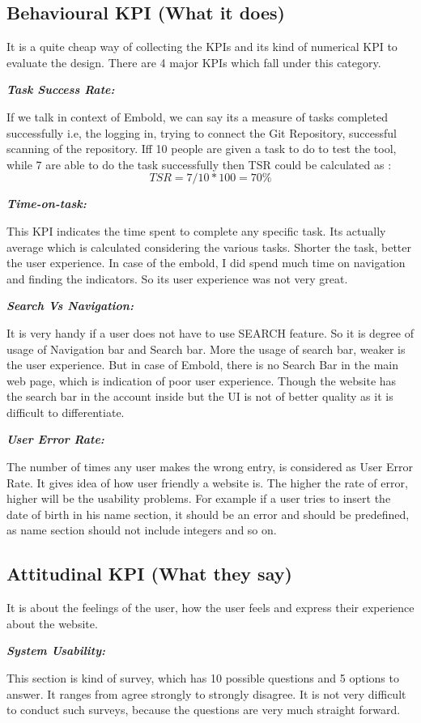 \subsection{Behavioural KPI (What it does)}
It is a quite cheap way of collecting the KPIs and its kind of numerical KPI to evaluate the design. There are 4 major KPIs which fall under this category. \par
\textbf{\emph{Task Success Rate:}}\par
\indent If we talk in context of Embold, we can say its a measure of tasks completed successfully i.e, the logging in, trying to connect the Git Repository, successful scanning of the repository. 
Iff 10 people are given a task to do to test the tool, while 7 are able to do the task successfully then TSR could be calculated as :\[TSR= 7/10*100=70\%\]\par
\textbf{\emph{Time-on-task:}}\par
This KPI indicates the time spent to complete any specific task. Its actually average which is calculated considering the various tasks. Shorter the task, better the user experience. In case of the embold, I did spend much time on navigation and finding the indicators. So its user experience was not very great. \par
\textbf{\emph{Search Vs Navigation:}}\par
It is very handy if a user does not have to use SEARCH feature. So it is degree of usage of Navigation bar and Search bar. More the usage of search bar, weaker is the user experience. But in case of Embold, there is no Search Bar in the main web page, which is indication of poor user experience. Though the website has the search bar in the account inside but the UI is not of better quality as it is difficult to differentiate. \par

\textbf{\emph{User Error Rate:}}\par
The number of times any user makes the wrong entry, is considered as User Error Rate. It gives idea of how user friendly a website is.  The higher the rate of error, higher will be the usability problems. For example if a user tries to insert the date of birth in his name section, it should be an error and should be predefined, as name section should not include integers and so on. \par

\subsection{ Attitudinal KPI (What they say)}
It is about the feelings of the user, how the user feels and express their experience about the website. \par
\textbf{\emph{System Usability:}}\par
This section is kind of survey, which has 10 possible questions and 5 options to answer. It ranges from agree strongly to strongly disagree. It is not very difficult to conduct such surveys, because the questions are very much straight forward. \par

